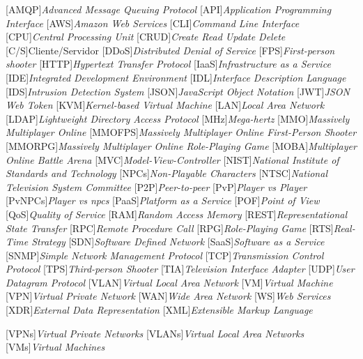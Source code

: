 \begin{acronym}[]
	[AMQP]{{\it Advanced Message Queuing Protocol}}
	[API]{{\it Application Programming Interface}}
  [AWS]{{\it Amazon Web Services}}
	[CLI]{{\it Command Line Interface}}
	[CPU]{{\it Central Processing Unit}}
	[CRUD]{{\it Create Read Update Delete}}
	[C/S]{{Cliente/Servidor}}
	[DDoS]{{\it Distributed Denial of Service}}
	[FPS]{{\it First-person shooter}}
	[HTTP]{{\it Hypertext Transfer Protocol}}
	[IaaS]{{\it Infrastructure as a Service}}
	[IDE]{{\it Integrated Development Environment}}
	[IDL]{{\it Interface Description Language}}
  [IDS]{{\it Intrusion Detection System}}
	[JSON]{{\it JavaScript Object Notation}}
	[JWT]{{\it JSON Web Token}}
	[KVM]{{\it Kernel-based Virtual Machine}}
	[LAN]{{\it Local Area Network}}
  [LDAP]{{\it Lightweight Directory Access Protocol}}
	[MHz]{{\it Mega-hertz}}
	[MMO]{{\it Massively Multiplayer Online}}
	[MMOFPS]{{\it Massively Multiplayer Online First-Person Shooter}}
	[MMORPG]{{\it Massively Multiplayer Online Role-Playing Game}}
	[MOBA]{{\it Multiplayer Online Battle Arena}}
	[MVC]{{\it Model-View-Controller}}
	[NIST]{{\it National Institute of Standards and Technology}}
	[NPCs]{{\it Non-Playable Characters}}
	[NTSC]{{\it National Television System Committee}}
	[P2P]{{\it Peer-to-peer}}
	[PvP]{{\it Player vs Player}}
	[PvNPCs]{{\it Player vs \ac{npcs}}}
	[PaaS]{{\it Platform as a Service}}
	[POF]{{\it Point of View}}
	[QoS]{{\it Quality of Service}}
	[RAM]{{\it Random Access Memory}}
	[REST]{{\it Representational State Transfer}}
	[RPC]{{\it Remote Procedure Call}}
	[RPG]{{\it Role-Playing Game}}
	[RTS]{{\it Real-Time Strategy}}
	[SDN]{{\it Software Defined Network}}
	[SaaS]{{\it Software as a Service}}
	[SNMP]{{\it Simple Network Management Protocol}}
	[TCP]{{\it Transmission Control Protocol}}
	[TPS]{{\it Third-person Shooter}}
	[TIA]{{\it Television Interface Adapter}}
	[UDP]{{\it User Datagram Protocol}}
	[VLAN]{{\it Virtual Local Area Network}}
	[VM]{{\it Virtual Machine}}
	[VPN]{{\it Virtual Private Network}}
	[WAN]{{\it Wide Area Network}}
	[WS]{{\it Web Services}}
	[XDR]{{\it External Data Representation}}
	[XML]{{\it Extensible Markup Language}}



	[VPNs]{{\it Virtual Private Networks}}
	[VLANs]{{\it Virtual Local Area Networks}}
	[VMs]{{\it Virtual Machines}}
\end{acronym}

